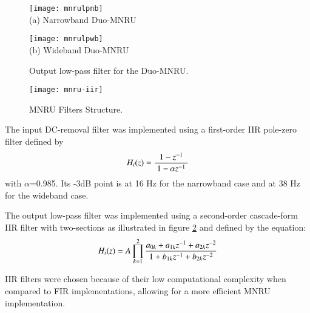 \begin{figure}[hp]
  \begin{center}
    \texttt{[image: mnrulpnb]}
    \\
    (a) Narrowband Duo-MNRU

    \texttt{[image: mnrulpwb]}
    \\
    (b) Wideband Duo-MNRU
  \end{center}
  \caption{ Output low-pass filter for the Duo-MNRU. \label{MNRU:lp-filter} }
\end{figure}


\begin{figure}[htb]
  \begin{center}
    \texttt{[image: mnru-iir]}
  \end{center}
  \caption{MNRU Filters Structure.\label{MNRU-IIR}}
\end{figure}


The input DC-removal filter was implemented using a first-order IIR
pole-zero filter defined by
\[
    H_i(z) = { 1-z^{-1} \over \ 1 - \alpha z^{-1} \ }
\]
with $\alpha$=0.985. Its -3dB point is at 16 Hz for the narrowband
case and at 38 Hz for the wideband case.

The output low-pass filter was implemented using a second-order
cascade-form IIR filter with two-sections as illustrated in figure
\ref{MNRU-IIR} and defined by the equation:
\[
    H_i(z) = A \prod_{k=1}^{2}
                    { a_{0k}+a_{1k}z^{-1}+a_{2k}z^{-2} \over
                      \ 1+b_{1k}z^{-1}+b_{2k} z^{-2} \
                                }
\]

IIR filters were chosen because of their low computational
complexity when compared to FIR implementations, allowing for a more
efficient MNRU implementation.


